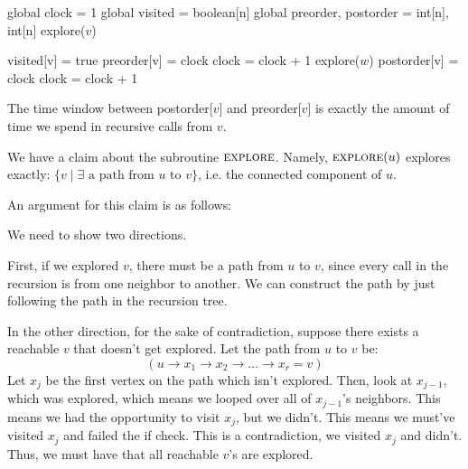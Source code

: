 \begin{algothm} 
    \begin{algorithmic}
            \State global clock = 1
            \State global visited = boolean[n]
            \State global preorder, postorder = int[n], int[n]
                    explore($v$)
                \EndIf
            \EndFor
        \EndFunction

            \State visited[v] = true
            \State preorder[v] = clock
            \State clock = clock + 1
                    explore($w$)
                \EndIf
            \EndFor
            \State postorder[v] = clock
            \State clock = clock + 1
        \EndFunction
    \end{algorithmic}

    The time window between postorder[$v$] and preorder[$v$] is exactly the amount of time we spend in recursive calls from $v$.

    We have a claim about the subroutine $\textsc{explore}$. Namely, $\textsc{explore}(u)$ explores exactly:
    $\{ v \mid \exists \text{ a path from $u$ to $v$}\}$, i.e. the connected component of $u$.

    An argument for this claim is as follows:
    \begin{proof*}
        We need to show two directions.

        First, if we explored $v$, there must be a path from $u$ to $v$, since every call in the recursion is from one neighbor to another. We can construct
        the path by just following the path in the recursion tree.

        In the other direction, for the sake of contradiction, suppose there exists a reachable $v$ that doesn't get explored. Let the path from $u$ to $v$ be:
        \[ (u \to x_1 \to x_2 \to \dots \to x_r = v) \]
        Let $x_j$ be the first vertex on the path which isn't explored. Then, look at $x_{j - 1}$, which was explored, which means we looped over all of $x_{j-1}$'s neighbors.
        This means we had the opportunity to visit $x_j$, but we didn't. This means we must've visited $x_j$ and failed the if check. This is a contradiction, we visited $x_j$ and didn't.
        Thus, we must have that all reachable $v$'s are explored.
    \end{proof*}


\end{algothm}
